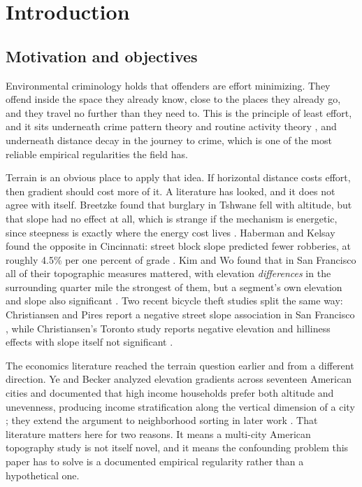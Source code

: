 \documentclass[11pt,letterpaper]{article}
\begin{document}
\begin{abstract}

\end{abstract}

\section{Introduction}

\subsection{Motivation and objectives}

Environmental criminology holds that offenders are effort minimizing. They offend
inside the space they already know, close to the places they already go, and they
travel no further than they need to. This is the principle of least effort, and it
sits underneath crime pattern theory \cite{brantingham1993} and routine activity
theory \cite{cohen1979}, and underneath distance decay in the journey to crime,
which is one of the most reliable empirical regularities the field has.

Terrain is an obvious place to apply that idea. If horizontal distance costs effort,
then gradient should cost more of it. A literature has looked, and it does not agree
with itself. Breetzke found that burglary in Tshwane fell with altitude, but that
slope had no effect at all, which is strange if the mechanism is energetic, since
steepness is exactly where the energy cost lives \cite{breetzke2012}. Haberman and
Kelsay found the opposite in Cincinnati: street block slope predicted fewer
robberies, at roughly 4.5\% per one percent of grade \cite{haberman2021}. Kim and Wo
found that in San Francisco all of their topographic measures mattered, with
elevation \emph{differences} in the surrounding quarter mile the strongest of them,
but a segment's own elevation and slope also significant \cite{kimwo2023}. Two
recent bicycle theft studies split the same way: Christiansen and Pires report a
negative street slope association in San Francisco \cite{bikesf2026}, while
Christiansen's Toronto study reports negative elevation and hilliness effects with
slope itself not significant \cite{biketoronto2026}.

The economics literature reached the terrain question earlier and from a different
direction. Ye and Becker analyzed elevation gradients across seventeen American
cities and documented that high income households prefer both altitude and
unevenness, producing income stratification along the vertical dimension of a city
\cite{yebecker2018}; they extend the argument to neighborhood sorting in later work
\cite{yebecker2024}. That literature matters here for two reasons. It means a
multi-city American topography study is not itself novel, and it means the
confounding problem this paper has to solve is a documented empirical regularity
rather than a hypothetical one.
\end{document}
